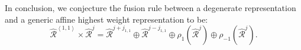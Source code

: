 \documentclass[10pt,a4paper]{article}
\numberwithin{equation}{section}
\newcommand{\vev}[1]{\left\langle #1 \right\rangle}
\begin{document}
In conclusion, we conjecture the fusion rule between a degenerate representation and a generic affine highest weight representation to be: 
\begin{equation}
    \widehat{\mathcal{R}}^{\vev{1,1}} \times \widehat{\mathcal{R}}^{j} = \widehat{\mathcal{R}}^{j+j_{1,1}} \oplus \widehat{\mathcal{R}}^{j-j_{1,1}}
    \oplus \rho_{1} \left( \widehat{\mathcal{R}}^{j} \right) \oplus \rho_{-1} \left( \widehat{\mathcal{R}}^{j} \right).
\end{equation}


\printbibliography
\end{document}
